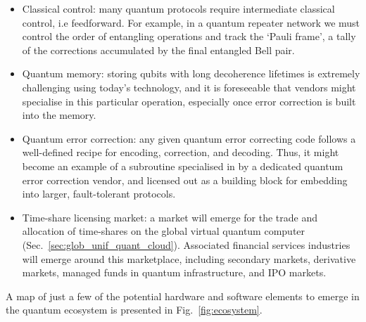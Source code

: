\begin{itemize}
\item Classical control: many quantum protocols require intermediate classical control, i.e feedforward. For example, in a quantum repeater network we must control the order of entangling operations and track the `Pauli frame', a tally of the corrections accumulated by the final entangled Bell pair.

\item Quantum memory: storing qubits with long decoherence lifetimes is extremely challenging using today's technology, and it is foreseeable that vendors might specialise in this particular operation, especially once error correction is built into the memory. 

\item Quantum error correction: any given quantum error correcting code follows a well-defined recipe for encoding, correction, and decoding. Thus, it might become an example of a subroutine specialised in by a dedicated quantum error correction vendor, and licensed out as a building block for embedding into larger, fault-tolerant protocols.

\item Time-share licensing market: a market will emerge for the trade and allocation of time-shares on the global virtual quantum computer (Sec.~\ref{sec:glob_unif_quant_cloud}). Associated financial services industries will emerge around this marketplace, including secondary markets, derivative markets, managed funds in quantum infrastructure, and IPO markets.
\end{itemize}

A map of just a few of the potential hardware and software elements to emerge in the quantum ecosystem is presented in Fig.~\ref{fig:ecosystem}.